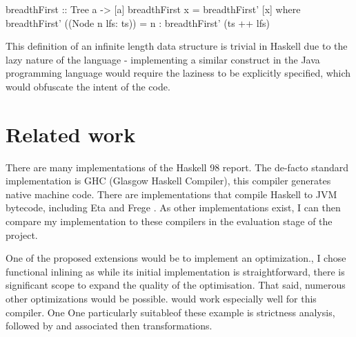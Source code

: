 \documentclass[float=false, crop=false]{standalone}
\begin{document}
\begin{minipage}{\linewidth}
\begin{HaskellLst}
breadthFirst :: Tree a -> [a]
breadthFirst x = breadthFirst' [x]
  where
    breadthFirst' ((Node n lfs: ts)) =
      n : breadthFirst' (ts ++ lfs)
\end{HaskellLst}
\end{minipage}
This definition of an infinite length data structure is trivial in 
Haskell due to the lazy nature of the language - implementing
a similar construct in the Java programming language would 
require the laziness to be explicitly specified, which 
would obfuscate the intent of the code. 





  

\section{Related work}

There are many implementations of the Haskell 98 report.
The de-facto standard implementation is GHC \cite{ghc} (Glasgow Haskell
Compiler), this compiler generates native machine code. There
are implementations that compile Haskell to JVM bytecode, including Eta \cite{eta} and Frege \cite{frege}. 
As other implementations exist, I can then 
compare my implementation to these compilers in the evaluation stage
of the project. 

One of the proposed extensions would be to implement an optimization.,
I chose functional inlining as while its initial implementation is straightforward, there is significant scope to expand the quality of the optimisation. That said, numerous other optimizations would be possible. 
would work especially well for this compiler. One One particularly suitableof these 
example is strictness analysis, followed by and
associated then transformations. 
\end{document}
